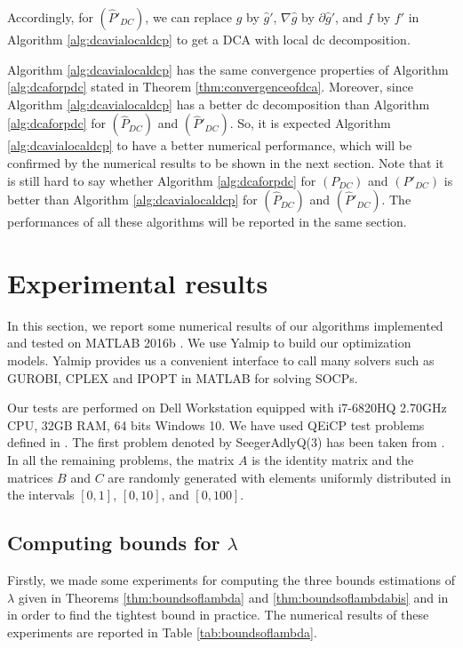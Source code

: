 \documentclass[3p]{elsarticle}
\begin{document}
Accordingly, for $(\hat{P}'_{DC})$, we can replace $\hat{g}$ by $\hat{g}'$, $\nabla\hat{g}$ by $\partial \hat{g}'$, and $f$ by $f'$ in Algorithm \ref{alg:dcavialocaldcp} to get a DCA with local dc decomposition.

\begin{rmk}
	Algorithm \ref{alg:dcavialocaldcp} has the same convergence properties of Algorithm \ref{alg:dcaforpdc} stated in Theorem \ref{thm:convergenceofdca}. Moreover, since Algorithm \ref{alg:dcavialocaldcp} has a better dc decomposition than Algorithm \ref{alg:dcaforpdc} for $(\hat{P}_{DC})$ and $(\hat{P}'_{DC})$. So, it is expected Algorithm \ref{alg:dcavialocaldcp} to have a better numerical performance, which will be confirmed by the numerical results to be shown in the next section. Note that it is still hard to say whether Algorithm \ref{alg:dcaforpdc} for $(P_{DC})$ and $(P'_{DC})$ is better than Algorithm \ref{alg:dcavialocaldcp} for $(\hat{P}_{DC})$ and $(\hat{P}'_{DC})$. The performances of all these algorithms will be reported in the same section.
\end{rmk}

\section{Experimental results}
\label{sec:experiments}
In this section, we report some numerical results of our algorithms implemented and tested on MATLAB 2016b \cite{Matlab}. We use Yalmip \cite{Yalmip} to build our optimization models. Yalmip provides us a convenient interface to call many solvers such as GUROBI, CPLEX and IPOPT in MATLAB for solving SOCPs.

Our tests are performed on Dell Workstation equipped with i7-6820HQ 2.70GHz CPU, 32GB RAM, 64 bits Windows 10. We have used QEiCP test problems defined in \cite{Adly11,Bras16,Fernandes14,Iusem16}. The first problem denoted by SeegerAdlyQ($3$) has been taken from \cite{Adly11}. In all the remaining problems,
the matrix $A$ is the identity matrix and the matrices $B$ and $C$ are randomly generated with elements uniformly distributed in the intervals $[0, 1]$, $[0, 10]$, and $[0, 100]$. 

\subsection{Computing bounds for $\lambda$}
Firstly, we made some experiments for computing the three bounds estimations of $\lambda$ given in Theorems \ref{thm:boundsoflambda} and \ref{thm:boundsoflambdabis} and in \cite{Fernandes14} in order to find the tightest bound in practice. The numerical results of these experiments are reported in Table \ref{tab:boundsoflambda}. 
\end{document}
